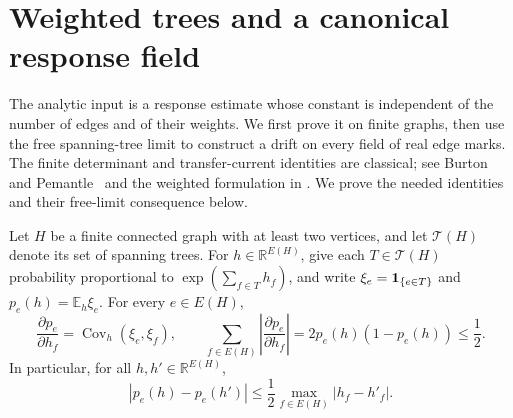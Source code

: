 \section{Weighted trees and a canonical response field}
\label{sec:response}

The analytic input is a response estimate whose constant is independent
of the number of edges and of their weights.  We first prove it on finite
graphs, then use the free spanning-tree limit to construct a
drift on every field of real edge marks. The finite determinant and
transfer-current identities are classical; see Burton and
Pemantle~\cite{BurtonPemantle1993} and the weighted formulation in
\cite[Section~4]{BLPS2001}. We prove the needed identities and their
free-limit consequence below.

\begin{lemma}
\label{lem:tree-response}
Let $H$ be a finite connected graph with at least two vertices, and let
$\mathcal T(H)$ denote its set of spanning trees.  For
$h\in\mathbb R^{E(H)}$, give each $T\in\mathcal T(H)$ probability
proportional to $\exp(\sum_{f\in T}h_f)$, and write
$\xi_e=\mathbf 1_{\{e\in T\}}$ and $p_e(h)=\mathbb E_h\xi_e$.
For every $e\in E(H)$,
\begin{equation}
\label{eq:covariance-row}
\frac{\partial p_e}{\partial h_f}
 =\operatorname{Cov}_h(\xi_e,\xi_f),
\qquad
\sum_{f\in E(H)}
 \left|\frac{\partial p_e}{\partial h_f}\right|
 =2p_e(h)(1-p_e(h))\le\frac12.
\end{equation}
In particular, for all $h,h'\in\mathbb R^{E(H)}$,
\begin{equation}
\label{eq:tree-response}
 |p_e(h)-p_e(h')|
 \le\frac12\max_{f\in E(H)}|h_f-h'_f|.
\end{equation}
\end{lemma}

